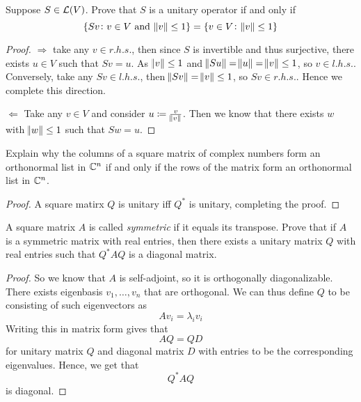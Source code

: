 \documentclass{extarticle}
\begin{document}
\begin{problem}{11}
    Suppose \(S \in \mathcal{L}(V)\). Prove that \(S\) is a unitary operator if and only if 
    \[\{Sv \colon v \in V \text{ and } \norm{v} \leq 1\} = \{v \in V \colon \norm{v} \leq 1\}\]
\end{problem}

\begin{proof}
\(\Rightarrow\) take any \(v \in r.h.s.\), then since \(S\) is invertible and thus surjective, there exists 
\(u \in V\) such that \(Sv = u\). As \(\norm{v} \leq 1\) and \(\norm{Su} = \norm{u} = \norm{v} \leq 1\), 
so \(v \in l.h.s.\). Conversely, take any \(Sv \in l.h.s.\), then \(\norm{Sv} = \norm{v} \leq 1\), so 
\(Sv \in r.h.s.\). Hence we complete this direction. 

\(\Leftarrow\) Take any \(v \in V\) and consider \(u \coloneqq \frac{v}{\norm{v}}\). Then we know that 
there exists \(w\) with \(\norm{w} \leq 1\) such that \(Sw = u \).  
\end{proof}

\begin{problem}{13}
    Explain why the columns of a square matrix of complex numbers form an orthonormal list in \(\mathbb{C}^n\) 
    if and only if the rows of the matrix form an orthonormal list in \(\mathbb{C}^n\). 
\end{problem}

\begin{proof}
A square matirx \(Q\) is unitary iff \(Q^*\) is unitary, completing the proof.
\end{proof}

\begin{problem}{18}
    A square matrix \(A\) is called \emph{symmetric} if it equals its transpose. Prove that if 
    \(A\) is a symmetric matrix with real entries, then there exists a unitary matrix \(Q\) with 
    real entries such that \(Q^* A Q\) is a diagonal matrix. 
\end{problem}

\begin{proof}
So we know that \(A\) is self-adjoint, so it is orthogonally diagonalizable. There exists eigenbasis 
\(v_1, \ldots, v_n\) that are orthogonal. We can thus define \(Q\) to be consisting of such eigenvectors
as 
\[Av_i = \lambda_i v_i\]
Writing this in matrix form gives that 
\[AQ = QD\]
for unitary matrix \(Q\) and diagonal matrix \(D\) with entries to be the corresponding eigenvalues. 
Hence, we get that 
\[Q^*AQ\]
is diagonal. 
\end{proof}
\end{document}
